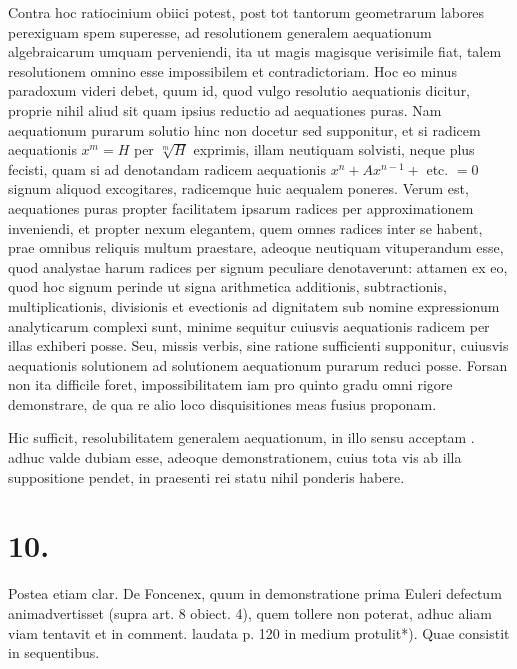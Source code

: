 \documentclass[twoside,12pt, showframe]{memoir}
\begin{document}
Contra hoc ratiocinium obiici potest, post tot tantorum geometrarum labores perexiguam spem superesse, ad resolutionem generalem aequationum algebraicarum umquam perveniendi, ita ut magis magisque verisimile fiat, talem resolutionem omnino esse impossibilem et contradictoriam. Hoc eo minus paradoxum videri debet, quum id, quod vulgo resolutio aequationis dicitur, proprie nihil aliud sit quam ipsius reductio ad aequationes puras. Nam aequationum purarum solutio hinc non docetur sed supponitur, et si radicem aequationis \(x^{m}=H\) per \(\sqrt[m]{H}\) exprimis, illam neutiquam solvisti, neque plus fecisti, quam si ad denotandam radicem aequationis \(x^{n}+A x^{n-1}+\) etc. \(=0\) signum aliquod excogitares, radicemque huic aequalem poneres. Verum est, aequationes puras propter facilitatem ipsarum radices per approximationem inveniendi, et propter nexum elegantem, quem omnes radices inter se habent, prae omnibus reliquis multum praestare, adeoque neutiquam vituperandum esse, quod analystae harum radices per signum peculiare denotaverunt: attamen ex eo, quod hoc signum perinde ut signa arithmetica additionis, subtractionis, multiplicationis, divisionis et evectionis ad dignitatem sub nomine expressionum analyticarum complexi sunt, minime sequitur cuiusvis aequationis radicem per illas exhiberi posse. Seu, missis verbis, sine ratione sufficienti supponitur, cuiusvis aequationis solutionem ad solutionem aequationum purarum reduci posse. Forsan non ita difficile foret, impossibilitatem iam pro quinto gradu omni rigore demonstrare, de qua re alio loco disquisitiones meas fusius proponam.

Hic sufficit, resolubilitatem generalem aequationum, in illo sensu acceptam . adhuc valde dubiam esse, adeoque demonstrationem, cuius tota vis ab illa suppositione pendet, in praesenti rei statu nihil ponderis habere.

\section*{10.}
Postea etiam clar. De Foncenex, quum in demonstratione prima Euleri defectum animadvertisset (supra art. 8 obiect. 4), quem tollere non poterat, adhuc aliam viam tentavit et in comment. laudata p. 120 in medium protulit*). Quae consistit in sequentibus.
\end{document}
